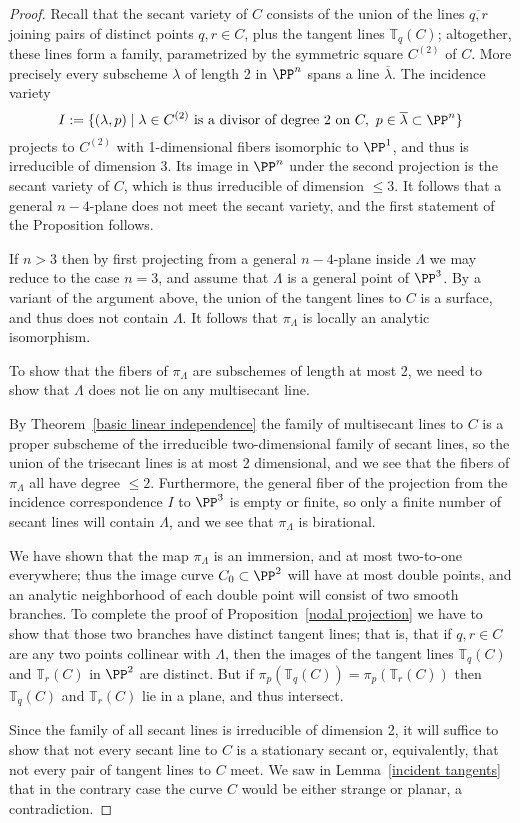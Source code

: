 \begin{proof} Recall that the secant variety of $C$ consists of the union of the lines $\overline{q,r}$ joining pairs of distinct points $q,r \in C$, plus the tangent lines ${\mathbb T}_q(C)$; altogether, these lines form a family, parametrized by the symmetric square $C^{(2)}$ of $C$. More precisely every subscheme $\lambda$ of
length 2 in $\PP^n$ spans a line $\overline \lambda$. The incidence variety
$$
I:=\{(\lambda, p)\mid \lambda\in C^{(2)} \hbox{ is a divisor of degree 2 on }C,\ p\in \overline \lambda\subset\PP^n\}
$$
projects to $C^{(2)}$ with 1-dimensional fibers isomorphic to $\PP^1$, and thus
is irreducible of dimension 3. Its image in $\PP^n$ under the second projection
is the secant variety of $C$, which is thus irreducible of dimension $\leq 3$.
It follows that a general
$n-4$-plane does not meet the secant variety, and the first statement of the Proposition follows.

If $n>3$ then by first projecting from a general $n-4$-plane inside $\Lambda$ we may reduce to the case $n=3$, and assume that $\Lambda$ is a general point of $\PP^3$. By a variant of the argument above, the union 
of the tangent lines to $C$ is a surface, and thus does not contain $\Lambda$.
It follows that $\pi_\Lambda$ is locally an analytic isomorphism.

To show that the fibers of $\pi_\Lambda$ are subschemes of length at most 2,
we need to show that $\Lambda$ does not lie on any multisecant line. 

By Theorem~\ref{basic linear independence} the family of multisecant lines to $C$ is a proper subscheme of the irreducible two-dimensional family of secant lines, so the union of the trisecant lines is at most 2 dimensional, and we see that the fibers of $\pi_\Lambda$ all have degree $\leq 2$. Furthermore, the general fiber of the projection
from the incidence correspondence $I$ to $\PP^3$ is empty or finite, so only a finite number of secant lines will contain $\Lambda$, and we see that $\pi_\Lambda$ is birational. 

We have shown that the map $\pi_\Lambda$ is an immersion, and at most two-to-one everywhere; thus the image curve $C_0 \subset \PP^2$ will have at most double points, and an analytic neighborhood of each double point will consist of two smooth branches. To complete the proof of Proposition~\ref{nodal projection} we have to show that those two branches have distinct tangent lines; that is, that
if $q, r \in C$ are any two points collinear with $\Lambda$, then the images of the tangent lines ${\mathbb T}_q(C)$ and ${\mathbb T}_r(C)$ in $\PP^2$ are distinct. But if  $\pi_p({\mathbb T}_q(C)) = \pi_p({\mathbb T}_r(C))$ then  ${\mathbb T}_q(C)$ and ${\mathbb T}_r(C)$ lie in a plane, and thus intersect.

Since the family of all secant lines is irreducible of dimension 2,  it will suffice to show that not every secant line to $C$ is a stationary secant or, equivalently, that not every pair of tangent lines to $C$ meet. We saw in Lemma~\ref{incident tangents} that in the contrary case the curve $C$ would be either strange or planar, a contradiction.
\end{proof}


